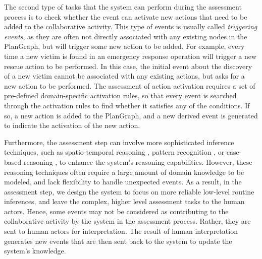 The second type of tasks that the system can perform during the assessment process is to check whether the event can activate new actions that need to be added to the collaborative activity. This type of events is usually called \emph{triggering events}, as they are often not directly associated with any existing nodes in the PlanGraph, but will trigger some new action to be added. For example, every time a new victim is found in an emergency response operation will trigger a new rescue action to be performed. In this case, the initial event about the discovery of a new victim cannot be associated with any existing actions, but asks for a new action to be performed. The assessment of action activation requires a set of pre-defined domain-specific activation rules, so that every event is searched through the activation rules to find whether it satisfies any of the conditions. If so, a new action is added to the PlanGraph, and a new derived event is generated to indicate the activation of the new action.

Furthermore, the assessment step can involve more sophisticated inference techniques, such as spatio-temporal reasoning \cite{Bennett}, pattern recognition \cite{zelnik2001event}, or case-based reasoning \cite{jakobson2004towards}, to enhance the system's reasoning capabilities. However, these reasoning techniques often require a large amount of domain knowledge to be modeled, and lack flexibility to handle unexpected events. As a result, in the assessment step, we design the system to focus on more reliable low-level routine inferences, and leave the complex, higher level assessment tasks to the human actors. Hence, some events may not be considered as contributing to the collaborative activity by the system in the assessment process. Rather, they are sent to human actors for interpretation. The result of human interpretation generates new events that are then sent back to the system to update the system's knowledge.


